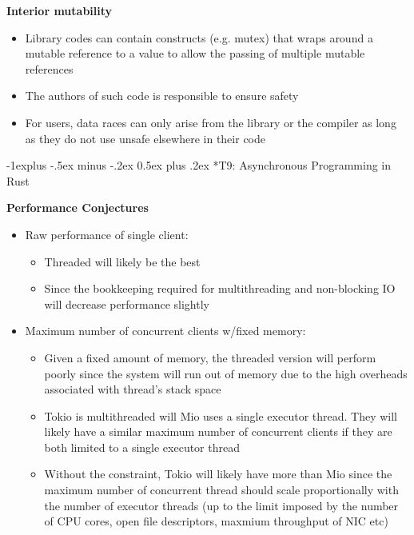 \documentclass[10pt, landscape]{article}
\makeatletter
\renewcommand{\subsection}{\@startsection{subsection}{2}{0mm}%
                                {-1explus -.5ex minus -.2ex}%
                                {0.5ex plus .2ex}%
                                {\normalfont\normalsize\bfseries}}
\makeatother
\begin{document}
\begin{multicols}{4}
\textbf{Interior mutability} \\ 
\begin{itemize}
    \item Library codes can contain constructs (e.g. mutex) that wraps around a mutable reference to a value to allow the passing of multiple mutable references 
    \item The authors of such code is responsible to ensure safety 
    \item For users, data races can only arise from the library or the compiler as long as they do not use unsafe elsewhere in their code
\end{itemize}

\subsection*{T9: Asynchronous Programming in Rust}

\textbf{Performance Conjectures} \\
\begin{itemize}
    \item Raw performance of single client:
    \begin{itemize}
        \item Threaded will likely be the best
        \item Since the bookkeeping required for multithreading and non-blocking IO will decrease performance slightly
    \end{itemize}
    \item Maximum number of concurrent clients w/fixed memory:
    \begin{itemize}
        \item Given a fixed amount of memory, the threaded version will perform poorly since the system will run out of memory due to the high overheads associated with thread's stack space 
        \item Tokio is multithreaded will Mio uses a single executor thread. They will likely have a similar maximum number of concurrent clients if they are both limited to a single executor thread 
        \item Without the constraint, Tokio will likely have more than Mio since the maximum number of concurrent thread should scale proportionally with the number of executor threads (up to the limit imposed by the number of CPU cores, open  file descriptors, maxmium throughput of NIC etc)
    \end{itemize}
\end{itemize}


\end{multicols}
\end{document}
